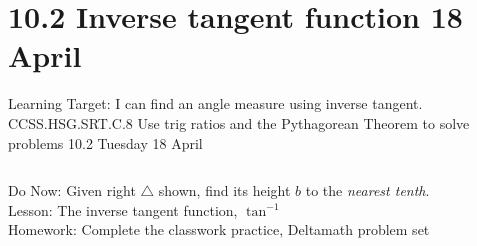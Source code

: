 \documentclass[onlytextwidth, aspectratio=169]{beamer}
\begin{document}
\section{10.2 Inverse tangent function \hfill 18 April \,}
\begin{frame}{Learning Target: I can find an angle measure using inverse tangent.}
  {CCSS.HSG.SRT.C.8 Use trig ratios and the Pythagorean Theorem to solve problems \hfill \alert{10.2 Tuesday 18 April}}
  \begin{columns}
    Do Now: Given right $\triangle$ shown, find its height $b$ to the \emph{nearest tenth}. \\[0.5cm]
    Lesson: The inverse tangent function, $\tan^{-1}$ \\[0.5cm]
    Homework: Complete the classwork practice, Deltamath problem set
    \begin{flushright}
    \end{flushright}
  \end{columns}
\end{frame}
\end{document}

